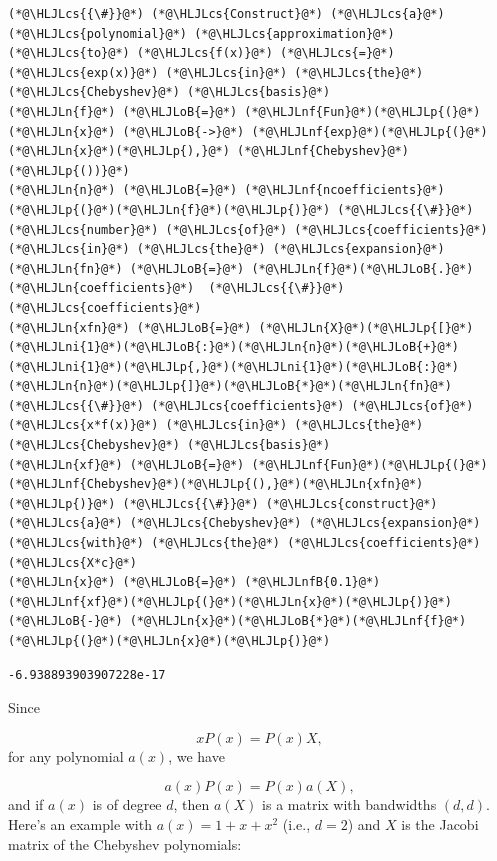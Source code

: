 \documentclass[12pt,a4paper]{article}
\newcommand{\HLJLn}[1]{#1}
\newcommand{\HLJLnf}[1]{\textcolor[RGB]{66,102,213}{#1}}
\newcommand{\HLJLnfB}[1]{\textcolor[RGB]{59,151,46}{#1}}
\newcommand{\HLJLni}[1]{\textcolor[RGB]{59,151,46}{#1}}
\newcommand{\HLJLoB}[1]{\textcolor[RGB]{102,102,102}{\textbf{#1}}}
\newcommand{\HLJLp}[1]{#1}
\newcommand{\HLJLcs}[1]{\textcolor[RGB]{153,153,119}{\textit{#1}}}
\begin{document}
\begin{lstlisting}
(*@\HLJLcs{{\#}}@*) (*@\HLJLcs{Construct}@*) (*@\HLJLcs{a}@*) (*@\HLJLcs{polynomial}@*) (*@\HLJLcs{approximation}@*) (*@\HLJLcs{to}@*) (*@\HLJLcs{f(x)}@*) (*@\HLJLcs{=}@*) (*@\HLJLcs{exp(x)}@*) (*@\HLJLcs{in}@*) (*@\HLJLcs{the}@*) (*@\HLJLcs{Chebyshev}@*) (*@\HLJLcs{basis}@*)
(*@\HLJLn{f}@*) (*@\HLJLoB{=}@*) (*@\HLJLnf{Fun}@*)(*@\HLJLp{(}@*)(*@\HLJLn{x}@*) (*@\HLJLoB{->}@*) (*@\HLJLnf{exp}@*)(*@\HLJLp{(}@*)(*@\HLJLn{x}@*)(*@\HLJLp{),}@*) (*@\HLJLnf{Chebyshev}@*)(*@\HLJLp{())}@*)
(*@\HLJLn{n}@*) (*@\HLJLoB{=}@*) (*@\HLJLnf{ncoefficients}@*)(*@\HLJLp{(}@*)(*@\HLJLn{f}@*)(*@\HLJLp{)}@*) (*@\HLJLcs{{\#}}@*) (*@\HLJLcs{number}@*) (*@\HLJLcs{of}@*) (*@\HLJLcs{coefficients}@*) (*@\HLJLcs{in}@*) (*@\HLJLcs{the}@*) (*@\HLJLcs{expansion}@*)
(*@\HLJLn{fn}@*) (*@\HLJLoB{=}@*) (*@\HLJLn{f}@*)(*@\HLJLoB{.}@*)(*@\HLJLn{coefficients}@*)  (*@\HLJLcs{{\#}}@*) (*@\HLJLcs{coefficients}@*)
(*@\HLJLn{xfn}@*) (*@\HLJLoB{=}@*) (*@\HLJLn{X}@*)(*@\HLJLp{[}@*)(*@\HLJLni{1}@*)(*@\HLJLoB{:}@*)(*@\HLJLn{n}@*)(*@\HLJLoB{+}@*)(*@\HLJLni{1}@*)(*@\HLJLp{,}@*)(*@\HLJLni{1}@*)(*@\HLJLoB{:}@*)(*@\HLJLn{n}@*)(*@\HLJLp{]}@*)(*@\HLJLoB{*}@*)(*@\HLJLn{fn}@*)  (*@\HLJLcs{{\#}}@*) (*@\HLJLcs{coefficients}@*) (*@\HLJLcs{of}@*) (*@\HLJLcs{x*f(x)}@*) (*@\HLJLcs{in}@*) (*@\HLJLcs{the}@*) (*@\HLJLcs{Chebyshev}@*) (*@\HLJLcs{basis}@*)
(*@\HLJLn{xf}@*) (*@\HLJLoB{=}@*) (*@\HLJLnf{Fun}@*)(*@\HLJLp{(}@*)(*@\HLJLnf{Chebyshev}@*)(*@\HLJLp{(),}@*)(*@\HLJLn{xfn}@*)(*@\HLJLp{)}@*) (*@\HLJLcs{{\#}}@*) (*@\HLJLcs{construct}@*) (*@\HLJLcs{a}@*) (*@\HLJLcs{Chebyshev}@*) (*@\HLJLcs{expansion}@*) (*@\HLJLcs{with}@*) (*@\HLJLcs{the}@*) (*@\HLJLcs{coefficients}@*) (*@\HLJLcs{X*c}@*)
(*@\HLJLn{x}@*) (*@\HLJLoB{=}@*) (*@\HLJLnfB{0.1}@*)
(*@\HLJLnf{xf}@*)(*@\HLJLp{(}@*)(*@\HLJLn{x}@*)(*@\HLJLp{)}@*) (*@\HLJLoB{-}@*) (*@\HLJLn{x}@*)(*@\HLJLoB{*}@*)(*@\HLJLnf{f}@*)(*@\HLJLp{(}@*)(*@\HLJLn{x}@*)(*@\HLJLp{)}@*)
\end{lstlisting}

\begin{lstlisting}
-6.938893903907228e-17
\end{lstlisting}


Since 

\[
xP(x) = P(x) X,
\]
for any polynomial $a(x)$, we have

\[
a(x) P(x) = P(x) a(X),
\]
and if $a(x)$ is of degree $d$, then $a(X)$ is a matrix with bandwidths $(d,d)$.  Here's an example with $a(x) = 1 + x + x^2$ (i.e., $d = 2$) and $X$ is the Jacobi matrix of the Chebyshev polynomials:
\end{document}
